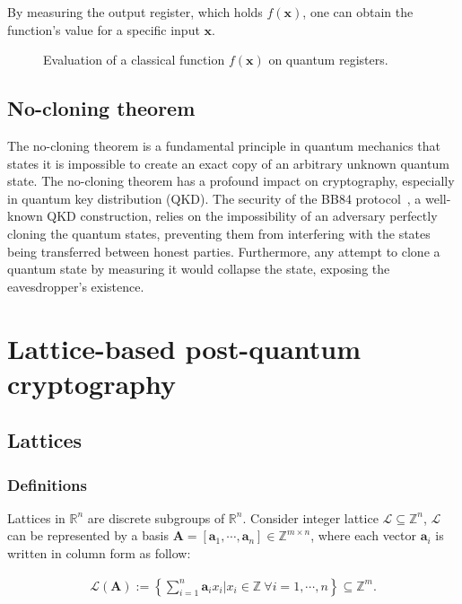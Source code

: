 \documentclass[cryptography,review,submit,pdftex,moreauthors,amsmath,amssymb,aps,strict]{Definitions/mdpi}
\newcommand{\peter}[1]{\textcolor{red}{#1}}
\begin{document}
By measuring the output register, which holds $f(\mathbf{x})$, one can obtain the function's value for a specific input $\mathbf{x}$. 
\begin{figure}[!htbp]
    \center
    
    \caption{Evaluation of a classical function $f(\mathbf{x})$ on quantum registers.}
    \label{fig:quantum_parallelism}
\end{figure}



\subsection{No-cloning theorem}

The no-cloning theorem is a fundamental principle in quantum mechanics that states it is impossible to create an exact copy of an arbitrary unknown quantum state. The no-cloning theorem has a profound impact on cryptography, especially in quantum key distribution (QKD). The security of the BB84 protocol~\cite{BB84}, a well-known QKD construction, relies on the impossibility of an adversary perfectly cloning the quantum states, preventing them from interfering with the states being transferred between honest parties. Furthermore, any attempt to clone a quantum state by measuring it would collapse the state, exposing the eavesdropper's existence.


\section{Lattice-based post-quantum cryptography} \label{post-quantum-cryptography-pqc}

\subsection{Lattices}
\subsubsection{Definitions}\label{lattice}
\begin{Definition}
    Lattices in $\mathbb{R}^n$ are discrete subgroups of $\mathbb{R}^n$. Consider integer lattice $\mathcal{L}\subseteq \mathbb{Z}^n$, $\mathcal{L}$ can be represented by a basis $\mathbf{A}=[\mathbf{a}_1,\cdots,\mathbf{a}_n]\in\mathbb{Z}^{m\times n}$, where each vector $\mathbf{a}_i$ is written in column form as follow: 

\begin{align}
    \mathcal{L}(\mathbf{A}):=\left\{\sum_{i=1}^n\mathbf{a}_i x_i | x_i\in\mathbb{Z}~\forall i=1,\cdots,n \right\}\subseteq\mathbb{Z}^m.
\end{align}
\end{Definition}
\end{document}
